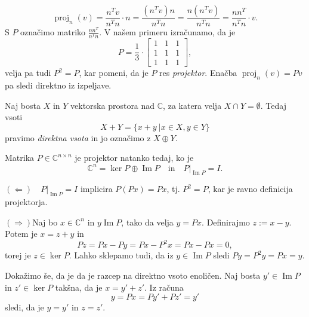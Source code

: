 \documentclass[mat1]{fmfdelo}
\newcommand{\C}{\mathbb C}
\DeclareMathOperator{\Ima}{Im}
\begin{document}
\begin{zgled}
\begin{equation*}
        \operatorname{proj}_{n}(v) = \frac{n^T  v}{n^T n}\cdot n = \frac{(n^T  v)n}{n^T n} = \frac{n(n^T  v)}{n^T n} = \frac{n  n^T}{n^T n}\cdot v.
    \end{equation*}
    S $P$ označimo matriko $\frac{n  n^T}{n^T n}$. V našem primeru izračunamo, da je
    \begin{equation*}
        P = \frac{1}{3}\cdot
        \begin{bmatrix}
            1 & 1 & 1 \\
            1 & 1 & 1 \\
            1 & 1 & 1
        \end{bmatrix},
    \end{equation*}
    velja pa tudi $P^2 = P$, kar pomeni, da je $P$ res \emph{projektor}. Enačba $\operatorname{proj}_n (v) = P v$ pa sledi direktno iz izpeljave.
\end{zgled}
\begin{definicija}
    Naj bosta $X$ in $Y$ vektorska prostora nad $\C$, za katera velja $X \cap Y = \emptyset$. Tedaj vsoti
    \begin{equation*}
        X + Y = \{x+y \ | x\in X, y\in Y\}
    \end{equation*}
    pravimo \emph{direktna vsota} in jo označimo z $X \oplus Y$.
\end{definicija}
\begin{trditev}
    Matrika $P \in \C^{n \times n}$ je projektor natanko tedaj, ko je
    \begin{equation*}
        \C^n = \ker P \oplus \Ima P\quad  \text{in}\quad P|_{\Ima P} = I.
    \end{equation*}
\end{trditev}
\begin{dokaz}
    $(\Leftarrow)$$\quad P|_{\Ima P} = I$ implicira $P(P x) = P x$, tj. $P^2 = P$, kar je ravno definicija projektorja.

    $(\Rightarrow)$Naj bo $x \in \C^n$ in $y \Ima P$, tako da velja $y = P x$. Definirajmo $z := x-y$. Potem je $x = z + y$ in
    \begin{equation*}
        P z = P x - P y = P x - P^2 x = P x - P x = 0,
    \end{equation*}
    torej je $z \in \ker P$. Lahko sklepamo tudi, da iz $y \in \Ima P$ sledi $P y = P^2 y = P x = y$.

    Dokažimo še, da je da je razcep na direktno vsoto enoličen. Naj bosta $y' \in \Ima P$ in $z' \in \ker P$ takšna, da je $x = y' + z'$. Iz računa
    \begin{equation*}
        y = P x = P y' + P z' = y'
    \end{equation*}
    sledi, da je $y = y'$ in $z = z'$.
\end{dokaz}
\end{document}
